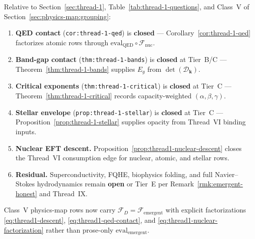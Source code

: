 \begin{corollary}
\label{cor:thread-1-closure}
Relative to Section~\ref{sec:thread-1}, Table~\ref{tab:thread-1-questions},
and Class~V of Section~\ref{sec:physics-map:grouping}:
\begin{enumerate}[label=(\roman*),leftmargin=*]
  \item \textbf{QED contact}
    (\texttt{cor:thread-1-qed}) is \textbf{closed} ---
    Corollary~\ref{cor:thread-1-qed} factorizes atomic rows through
    $\mathrm{eval}_{\mathrm{QED}}\circ\mathcal{F}_{\mathrm{nuc}}$.
  \item \textbf{Band-gap contact}
    (\texttt{thm:thread-1-bands}) is \textbf{closed} at Tier~B/C ---
    Theorem~\ref{thm:thread-1-bands} supplies $E_g$ from
    $\det(\mathcal{D}_{\mathbf{k}})$.
  \item \textbf{Critical exponents}
    (\texttt{thm:thread-1-critical}) is \textbf{closed} at Tier~C ---
    Theorem~\ref{thm:thread-1-critical} records capacity-weighted
    $(\alpha,\beta,\gamma)$.
  \item \textbf{Stellar envelope}
    (\texttt{prop:thread-1-stellar}) is \textbf{closed} at Tier~C ---
    Proposition~\ref{prop:thread-1-stellar} supplies opacity from Thread~VI
    binding inputs.
  \item \textbf{Nuclear EFT descent.}
    Proposition~\ref{prop:thread1-nuclear-descent} closes the Thread~VI
    consumption edge for nuclear, atomic, and stellar rows.
  \item \textbf{Residual.} Superconductivity, FQHE, biophysics folding, and
    full Navier--Stokes hydrodynamics remain \textbf{open} or Tier~E per
    Remark~\ref{rmk:emergent-honest} and Thread~IX.
\end{enumerate}
Class~V physics-map rows now carry $\mathcal{F}_D=\mathcal{F}_{\mathrm{emergent}}$
with explicit factorizations \eqref{eq:thread1-descent},
\eqref{eq:thread1-qed-contact}, and \eqref{eq:thread1-nuclear-factorization}
rather than prose-only $\mathrm{eval}_{\mathrm{emergent}}$.
\end{corollary}

